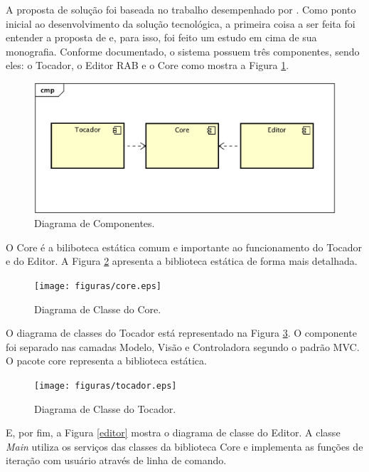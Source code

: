 A proposta de solução foi baseada no trabalho desempenhado por \cite{herbert}. Como ponto inicial ao desenvolvimento da solução tecnológica, a primeira coisa a ser feita foi entender a proposta de \cite{herbert} e, para isso, foi feito um estudo em cima de sua monografia. Conforme documentado, o sistema possuem três componentes, sendo eles: o Tocador, o Editor RAB e o Core como mostra a Figura \ref{components}.

 \begin{figure}[ht]
	\centering
		\includegraphics[keepaspectratio=true,scale=0.5]{figuras/components.eps}
	\caption{Diagrama de Componentes.}
	\label{components}
\end{figure}

O Core é a biliboteca estática comum e importante ao funcionamento do Tocador e do Editor. A Figura \ref{core} apresenta a biblioteca estática de forma mais detalhada. 

 \begin{figure}[ht]
	\centering
		\texttt{[image: figuras/core.eps]}
	\caption{Diagrama de Classe do Core.}
	\label{core}
\end{figure}

O diagrama de classes do Tocador está representado na Figura \ref{tocador}. O componente foi separado nas camadas Modelo, Visão e Controladora segundo o padrão MVC. O pacote core representa a biblioteca estática.

\begin{figure}[ht]
	\centering
		\texttt{[image: figuras/tocador.eps]}
	\caption{Diagrama de Classe do Tocador.}
	\label{tocador}
\end{figure}

E, por fim, a Figura \ref{editor} mostra o diagrama de classe do Editor. A classe \textit{Main} utiliza os serviços das classes da biblioteca Core e implementa as funções de iteração com usuário através de linha de comando.

